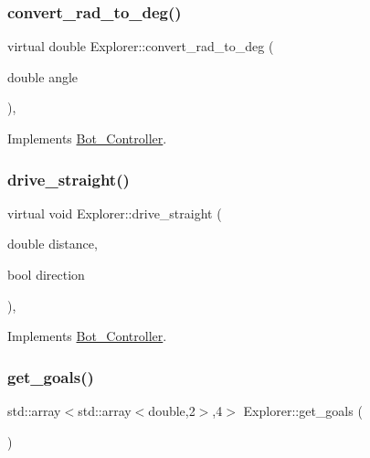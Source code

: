 \subsubsection{\texorpdfstring{convert\+\_\+rad\+\_\+to\+\_\+deg()}{convert\_rad\_to\_deg()}}
{\footnotesize\ttfamily virtual double Explorer\+::convert\+\_\+rad\+\_\+to\+\_\+deg (\begin{DoxyParamCaption}\item[{double}]{angle }\end{DoxyParamCaption})\hspace{0.3cm}{\ttfamily [override]}, {\ttfamily [virtual]}}



Implements \hyperlink{class_bot___controller_a722a49277ba04f303ca588d80a4910c3}{Bot\+\_\+\+Controller}.

\mbox{\label{class_explorer_a38e04dc019525baca8530b6cf3e779de}} 
\subsubsection{\texorpdfstring{drive\+\_\+straight()}{drive\_straight()}}
{\footnotesize\ttfamily virtual void Explorer\+::drive\+\_\+straight (\begin{DoxyParamCaption}\item[{double}]{distance,  }\item[{bool}]{direction }\end{DoxyParamCaption})\hspace{0.3cm}{\ttfamily [override]}, {\ttfamily [virtual]}}



Implements \hyperlink{class_bot___controller_afff936a963b8b3b4b641a7f152b45166}{Bot\+\_\+\+Controller}.

\mbox{\label{class_explorer_a847e3ad2e7233d493a8dcfdd7139cb58}} 
\subsubsection{\texorpdfstring{get\+\_\+goals()}{get\_goals()}}
{\footnotesize\ttfamily std\+::array$<$std\+::array$<$double,2$>$,4$>$ Explorer\+::get\+\_\+goals (\begin{DoxyParamCaption}{ }\end{DoxyParamCaption})\hspace{0.3cm}{\ttfamily [inline]}}



